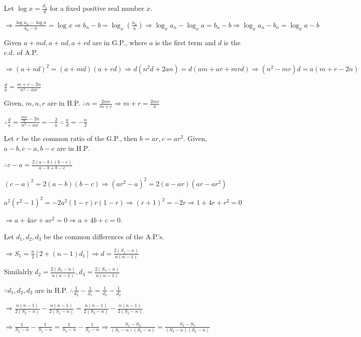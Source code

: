   Let $\log x = \frac{d_1}{d}$ for a fixed positive real number $x.$

  $\Rightarrow \frac{\log a_n - \log a}{b_n - b} = \log x \Rightarrow b_n - b =
  \log_x\left(\frac{a_n}{a}\right)\Rightarrow \log_x a_n - \log_x a = b_n - b \Rightarrow \log_x a_n - b_n =
  \log_x a - b$
\item Given $a + md, a + nd, a + rd$ are in G.P., where $a$ is the first term and $d$ is the c.d. of A.P.

  $\Rightarrow (a + nd)^2 = (a + md)(a + rd)\Rightarrow d(n^2d + 2an) = d(am + ar + mrd)\Rightarrow (n^2 -
  mr)d = a(m + r - 2n)$

  $\frac{d}{a} = \frac{m + r - 2n}{n^2 - mr}$

  Given, $m, n, r$ are in H.P. $\therefore n = \frac{2mr}{m + r} \Rightarrow m + r = \frac{2mr}{n}$

  $\therefore \frac{d}{a} = \frac{\frac{2mr}{n} - 2n}{n^2 - mr} = -\frac{2}{n}\;\therefore\; \frac{a}{d} =
  -\frac{n}{2}$
\item Let $r$ be the common ratio of the G.P., then $b = ar, c = ar^2.$ Given, $a - b, c - a, b - c$ are in H.P.

  $\therefore c - a = \frac{2(a - b)(b - c)}{a - b + b - c}$

  $(c - a)^2 = 2(a - b)(b - c)\Rightarrow (ar^2 - a)^2 = 2(a - ar)(ar - ar^2)$

  $a^2(r^2 - 1)^2 = -2a^2(1 - r)r(1 - r)\Rightarrow (r + 1)^2 = -2r \Rightarrow 1 + 4r + r^2 = 0$

  $\Rightarrow a + 4ar + ar^2 = 0 \Rightarrow a + 4b + c = 0$.
\item Let $d_1, d_2, d_3$ be the common differences of the A.P.'s.

  $\Rightarrow S_1 = \frac{n}{2}[2 + (n - 1)d_1]\Rightarrow d = \frac{2(S_1 - n)}{n(n - 1)}$

  $\text{Similalrly}\;d_2 = \frac{2(S_2 - n)}{n(n - 1)}, d_3 = \frac{2(S_3 - n)}{n(n - 1)}$

  $\because d_1, d_2, d_3$ are in H.P. $\therefore \frac{1}{d_2} - \frac{1}{d_1} = \frac{1}{d_3} - \frac{1}{d_2}$

  $\Rightarrow \frac{n(n - 1)}{2(S_2 - n)} - \frac{n(n - 1)}{2(S_1 - n)} = \frac{n(n - 1)}{2(S_3 - n)} -
  \frac{n(n - 1)}{2(S_2 - n)}$

  $\Rightarrow \frac{1}{S_2 - n} - \frac{1}{S_1 - n} = \frac{1}{S_3 -n} - \frac{1}{S_2 -n}\Rightarrow
  \frac{S_1 - S_2}{(S_1 - n)(S_2 - n)} = \frac{S_2 - S_3}{(S_3 - n)(S_2 - n)}$


